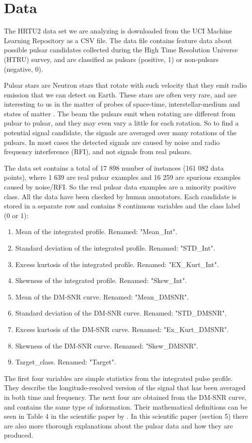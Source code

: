 \documentclass[12pt,a4paper,english]{article}
\begin{document}
\section{Data}
\label{sect:Data}
The HRTU2 data set we are analyzing is downloaded from the UCI Machine Learning Repository \cite{UCI} as a CSV file. The data file contains feature data about possible pulsar candidates collected during the High Time Resolution Universe (HTRU) survey, and are classified as pulsars (positive, 1) or non-pulsars (negative, 0). 

Pulsar stars are Neutron stars that rotate with such velocity that they emit radio emission that we can detect on Earth. These stars are often very rare, and are interesting to us in the matter of probes of space-time, interstellar-medium and states of matter \cite{UCI}. The beam the pulsars emit when rotating are different from pulsar to pulsar, and they may even vary a little for each rotation. So to find a potential signal candidate, the signals are averaged over many rotations of the pulsars. In most cases the detected signals are caused by noise and radio frequency interference (RFI), and not signals from real pulsars.

The data set contains a total of 17 898 number of instances (161 082 data points), where 1 639 are real pulsar examples and 16 259 are spurious examples caused by noise/RFI. So the real pulsar data examples are a minority positive class. All the data have been checked by human annotators. Each candidate is stored in a separate row and contains 8 continuous variables and the class label (0 or 1):
\begin{enumerate}
	\item Mean of the integrated profile. Renamed: "Mean\_Int".
	\item Standard deviation of the integrated profile. Renamed: "STD\_Int".
	\item Excess kurtosis of the integrated profile. Renamed: "EX\_Kurt\_Int".
	\item Skewness of the integrated profile. Renamed: "Skew\_Int".
	\item Mean of the DM-SNR curve. Renamed: "Mean\_DMSNR".
	\item Standard deviation of the DM-SNR curve. Renamed: "STD\_DMSNR".
	\item Excess kurtosis of the DM-SNR curve. Renamed: "Ex\_Kurt\_DMSNR".
	\item Skewness of the DM-SNR curve. Renamed: "Skew\_DMSNR".
	\item Target\_class. Renamed: "Target".
\end{enumerate}
The first four variables are simple statistics from the integrated pulse profile. They describe the longitude-resolved version of the signal that has been averaged in both time and frequency. The next four are obtained from the DM-SNR curve, and contains the same type of information. Their mathematical definitions can be seen in Table 4 in the scientific paper by \citet{pulsar_art}. In this scientific paper (section 5) there are also more thorough explanations about the pulsar data and how they are produced.
\end{document}
